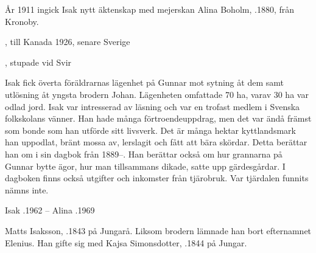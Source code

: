 År 1911 ingick Isak nytt äktenskap med mejerskan Alina Boholm, .1880, från Kronoby.

\begin{jhchildren}
  \item {}, till Kanada 1926, senare Sverige
  \item {}
  \item {}
  \item {}
  \item {}, stupade vid Svir
  \item {}
\end{jhchildren}

Isak fick överta föräldrarnas lägenhet på Gunnar mot sytning åt dem samt utlösning åt yngsta brodern Johan. Lägenheten omfattade 70 ha, varav 30 ha var odlad jord. Isak var intresserad av läsning och var en trofast medlem i Svenska folkskolans vänner. Han hade många förtroendeuppdrag, men det var ändå främst som bonde som han utförde sitt livsverk. Det är många hektar kyttlandsmark han uppodlat, bränt mossa av, lerslagit och fått att bära skördar. Detta berättar han om i sin dagbok från 1889--. Han berättar också om  hur grannarna på Gunnar bytte ägor, hur man tillsammans dikade, satte upp gärdesgårdar. I dagboken finns också utgifter och inkomster från tjärobruk. Var tjärdalen funnits nämns	inte.

Isak .1962  --  Alina .1969


Matts Isaksson, .1843 på Jungarå. Liksom brodern lämnade han bort efternamnet Elenius. Han gifte sig med Kajsa Simonsdotter,	.1844 på Jungar.

\begin{jhchildren}
  \item {}
  \item {}
  \item {}
  \item {}
  \item {}
  \item {}
  \item {}
  \item {}
\end{jhchildren}

